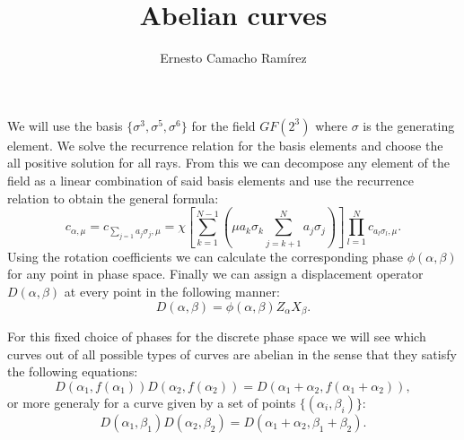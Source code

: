 \documentclass[a4paper]{article}
\title{Abelian curves}
\author{Ernesto Camacho Ramírez}
\begin{document}
  \maketitle

  We will use the basis $\{\sigma^3,\sigma^5,\sigma^6\}$ for
  the field $GF(2^3)$ where $\sigma$ is the generating
  element. We solve the recurrence relation for the basis
  elements and choose the all positive solution for all
  rays. From this we can decompose any element of the field
  as a linear combination of said basis elements and use the
  recurrence relation to obtain the general formula:
  \begin{equation}
    c_{\alpha,\mu}
    = c_{\sum_{j=1}^{} a_j \sigma_j,\mu}
    = \chi\left[
    \sum_{k=1}^{N-1} \left(
      \mu a_k \sigma_k
      \sum_{j=k+1}^{N} a_j \sigma_j
    \right) \right]
    \prod_{l=1}^N c_{a_l \sigma_l, \mu}.
  \end{equation}
  Using the rotation coefficients we can calculate the
  corresponding phase $\phi(\alpha,\beta)$ for any point in
  phase space. Finally we can assign a displacement operator
  $D(\alpha,\beta)$ at every point in the following manner:
  \begin{equation}
    D(\alpha,\beta)
    = \phi(\alpha,\beta) Z_\alpha X_\beta.
  \end{equation}

  For this fixed choice of phases for the discrete phase
  space we will see which curves out of all possible types
  of curves are abelian in the sense that they satisfy the
  following equations:
  \begin{equation}
    D(\alpha_1,f(\alpha_1)) D(\alpha_2,f(\alpha_2))
    = D(\alpha_1+\alpha_2, f(\alpha_1+\alpha_2)),
  \end{equation}
  or more generaly for a curve given by a set of points
  $\{(\alpha_i,\beta_i)\}$:
  \begin{equation}
    \label{eqn:prop}
    D(\alpha_1,\beta_1) D(\alpha_2,\beta_2)
    = D(\alpha_1+\alpha_2, \beta_1+\beta_2).
  \end{equation}
\end{document}
